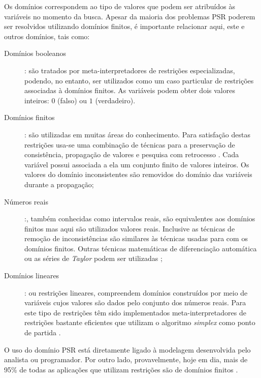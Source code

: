 Os domínios correspondem ao tipo de valores que podem ser atribuídos às variáveis no momento da busca. Apesar da maioria dos problemas PSR poderem ser resolvidos utilizando domínios finitos, é importante relacionar aqui, este e outros domínios, tais como:


\begin{description}



  \item [Domínios booleanos]: são tratados por meta-interpretadores de restrições especializadas, podendo, no entanto, ser utilizados como um caso particular de restrições associadas à domínios finitos. As variáveis podem obter dois valores inteiros: $0$ (falso) ou $1$ (verdadeiro).

  \item [Domínios finitos]: são utilizadas em muitas áreas do conhecimento. Para satisfação destas restrições usa-se uma combinação de técnicas para a preservação de consistência, propagação de valores e pesquisa com retrocesso \cite{sucupira_03, apt_2003}. Cada variável possui associada a ela um conjunto finito de valores inteiros. Os valores do domínio inconsistentes são removidos do domínio das variáveis durante a propagação;

  \item [Números reais]:, também conhecidas como intervalos reais, são equivalentes aos domínios finitos mas aqui são utilizados valores reais. Inclusive as técnicas de remoção de inconsistências são similares às técnicas usadas para com os domínios finitos. Outras técnicas matemáticas de diferenciação automática ou as séries de \textit{Taylor} podem ser utilizadas \cite{sucupira_03};

  \item [Domínios lineares]: ou restrições lineares, compreendem domínios construídos por meio de variáveis cujos valores são dados pelo conjunto dos números reais. Para este tipo de restrições têm sido implementados meta-interpretadores de restrições bastante eficientes que utilizam o algoritmo \textit{simplex} como ponto de partida \cite{sucupira_03}.
\end{description}


O uso do domínio PSR está diretamente ligado à modelagem desenvolvida pelo analista ou programador. Por outro lado, provavelmente, hoje em dia, mais de 95\% de todas as aplicações que utilizam restrições são de domínios finitos \cite{tsang93, apt2003}. 




